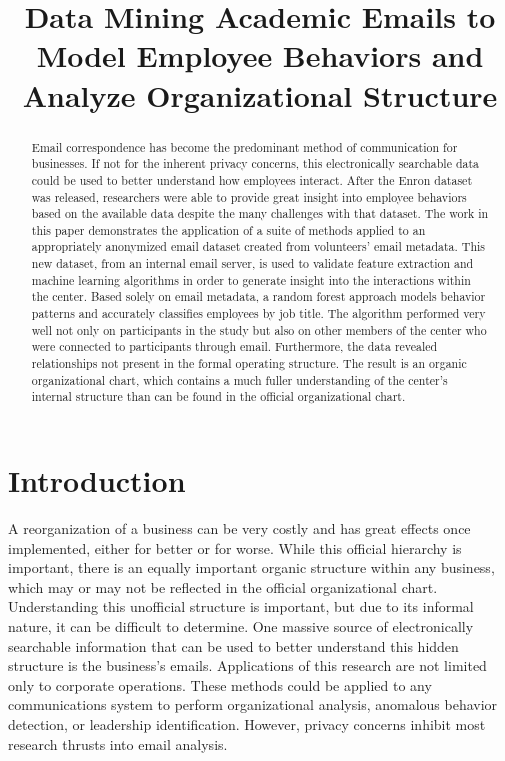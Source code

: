 \documentclass[10pt,twocolumn,conference]{IEEEtran}
\begin{document}
    
\title{Data Mining Academic Emails to Model Employee Behaviors and Analyze Organizational Structure\vspace{-7.5pt}}
\author{
} 
\maketitle

\begin{abstract}
Email correspondence has become the predominant method of communication for businesses.
If not for the inherent privacy concerns, this electronically searchable data could be used to better understand how employees interact.
After the Enron dataset was released, researchers were able to provide great insight into employee behaviors based on the available data despite the many challenges with that dataset.
The work in this paper demonstrates the application of a suite of methods applied to an appropriately anonymized email dataset created from volunteers' email metadata.
This new dataset, from an internal email server, is used to validate feature extraction and machine learning algorithms in order to generate insight into the interactions within the center.
Based solely on email metadata, a random forest approach models behavior patterns and accurately classifies employees by job title.
The algorithm performed very well not only on participants in the study but also on other members of the center who were connected to participants through email.
Furthermore, the data revealed relationships not present in the formal operating structure.
The result is an organic organizational chart, which contains a much fuller understanding of the center's internal structure than can be found in the official organizational chart.
\end{abstract}

\section{Introduction}
A reorganization of a business can be very costly and has great effects once implemented, either for better or for worse.
While this official hierarchy is important, there is an equally important organic structure within any business, which may or may not be reflected in the official organizational chart.
Understanding this unofficial structure is important, but due to its informal nature, it can be difficult to determine.
One massive source of electronically searchable information that can be used to better understand this hidden structure is the business's emails.
Applications of this research are not limited only to corporate operations.
These methods could be applied to any communications system to perform organizational analysis, anomalous behavior detection, or leadership identification.
However, privacy concerns inhibit most research thrusts into email analysis.  
\end{document}
